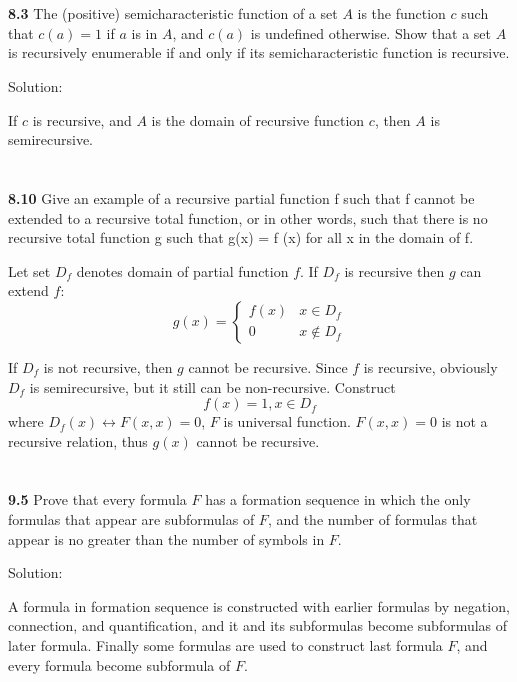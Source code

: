 \documentclass{ctexart}
\begin{document}
\section*{}
\textbf{8.3} The (positive) semicharacteristic function of a set $A$ is the function $c$ such
that $c(a) = 1$ if $a$ is in $A$, and $c(a)$ is undefined otherwise. Show that a set $A$ is
recursively enumerable if and only if its semicharacteristic function is recursive.

Solution:

If $c$ is recursive, and $A$ is the domain of recursive function $c$, then $A$ is semirecursive.

\section*{}
\textbf{8.10} Give an example of a recursive partial function f such that f
cannot be extended to a recursive total function, or in other words, such that there is no
recursive total function g such that g(x) = f (x) for all x in the domain of f.

Let set $D_f$ denotes domain of partial function $f$. If $D_f$ is recursive
then $g$ can extend $f$:
$$
g(x) = \begin{cases}
	f(x) & x \in D_f \\
	0 & x \not\in D_f
\end{cases}
$$

If $D_f$ is not recursive, then $g$ cannot be recursive. Since $f$ is recursive,
obviously $D_f$ is semirecursive, but it still can be non-recursive. Construct
$$
f(x) = 1, x \in D_f
$$
where $D_f(x) \leftrightarrow F(x, x) = 0$, $F$ is universal function. $F(x, x) = 0$ is not a
recursive relation, thus $g(x)$ cannot be recursive.

\section*{}
\textbf{9.5} Prove that every formula $F$ has a formation sequence in which the only formulas
that appear are subformulas of $F$, and the number of formulas that appear is no greater than
the number of symbols in $F$.

Solution:

A formula in formation sequence is constructed with earlier formulas by negation, connection, and
quantification, and it and its subformulas become subformulas of later formula. Finally some
formulas are used to construct last formula $F$, and every formula become subformula of $F$.
\end{document}

